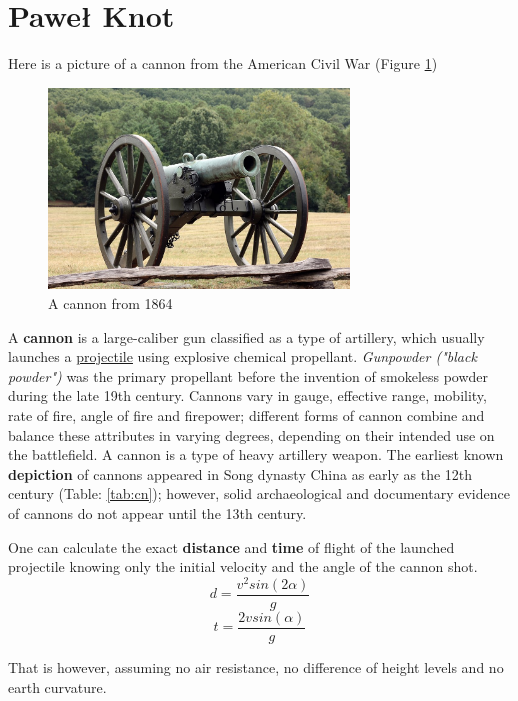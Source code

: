 \section{Paweł Knot}
\label{pknot}

Here is a picture of a cannon from the American Civil War (Figure \ref{fig:cn})

\begin{figure}[h]
    \centering
    \includegraphics[width=8cm]{Pictures/Cannon.jpg}
    \caption{A cannon from 1864}
    \label{fig:cn}
\end{figure}

\begin{center}
    A \textbf{cannon} is a large-caliber gun classified as a type of artillery, which usually launches a \underline{projectile} using explosive chemical propellant. \textit{Gunpowder ("black powder")} was the primary propellant before the invention of smokeless powder during the late 19th century. Cannons vary in gauge, effective range, mobility, rate of fire, angle of fire and firepower; different forms of cannon combine and balance these attributes in varying degrees, depending on their intended use on the battlefield. A cannon is a type of heavy artillery weapon.
    The earliest known \textbf{depiction} of cannons appeared in Song dynasty China as early as the 12th century (Table: \ref{tab:cn}); however, solid archaeological and documentary evidence of cannons do not appear until the 13th century.
\end{center}



One can calculate the exact \textbf{distance} and \textbf{time} of flight of the launched projectile knowing only the initial velocity and the angle of the cannon shot. 
\[d = \frac{v^2sin(2\alpha)}{g}\]
\[t = \frac{2vsin(\alpha)}{g}\]

That is however, assuming no air resistance, no difference of height levels and no earth curvature.

